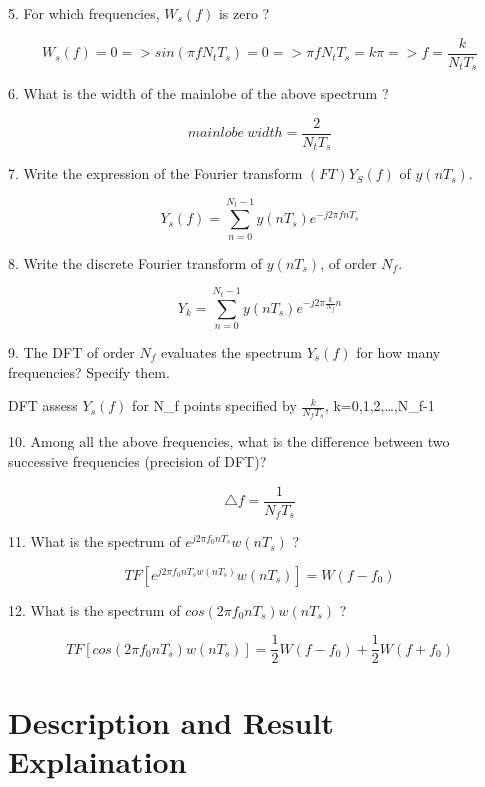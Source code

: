 \documentclass{article}
\begin{document}
5. For which frequencies, $W_s(f)$ is zero ?

\begin{equation}
    W_s(f) = 0 => sin(\pi fN_tT_s)=0 => \pi fN_tT_s=k\pi => f=\frac{k}{N_tT_s}
\end{equation}

6. What is the width of the mainlobe of the above spectrum ? 

\begin{equation}
    mainlobe~width = \frac{2}{N_tT_s}
\end{equation}

7. Write the expression of the Fourier transform $(FT)Y_S(f)$ of $y(nT_s)$.

\begin{equation}
    Y_s(f) = \sum_{n=0}^{N_t-1}y(nT_s)e^{-j2\pi fnT_s}
\end{equation}

8. Write the discrete Fourier transform of $y(nT_s)$, of order $N_f$.

\begin{equation}
    Y_k = \sum_{n=0}^{N_t-1}y(nT_s)e^{-j2\pi \frac{k}{N_f}n}
\end{equation}

9. The DFT of order $N_f$ evaluates the spectrum $Y_s(f)$ for how many frequencies? Specify them.

DFT assess $Y_s(f)$ for N_f points specified by $\frac{k}{N_fT_s}$, k=0,1,2,\ldots,N_f-1

10. Among all the above frequencies, what is the difference between two successive frequencies (precision of DFT)? 

\begin{equation}
    \triangle f = \frac{1}{N_fT_s}
\end{equation}

11. What is the spectrum of $e^{j2\pi f_0nT_s}w(nT_s)$ ?

\begin{equation}
    TF[e^{j2\pi f_0nT_sw(nT_s)}w(nT_s)] = W(f-f_0)
\end{equation}

12. What is the spectrum of $cos(2\pi f_0nT_s)w(nT_s)$ ?

\begin{equation}
    TF[cos(2\pi f_0nT_s)w(nT_s)] = \frac{1}{2}W(f-f_0) + \frac{1}{2}W(f+f_0)
\end{equation}

\section{Description and Result Explaination}
\end{document}
